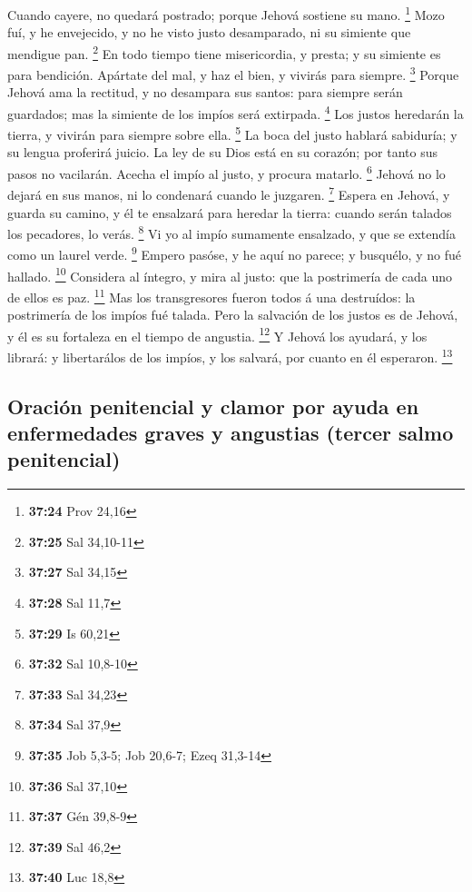  Cuando cayere, no quedará postrado; porque Jehová sostiene
su mano. \footnote{\textbf{37:24} Prov 24,16}  Mozo fuí, y
he envejecido, y no he visto justo desamparado, ni su simiente que
mendigue pan. \footnote{\textbf{37:25} Sal 34,10-11}  En
todo tiempo tiene misericordia, y presta; y su simiente es para
bendición.  Apártate del mal, y haz el bien, y vivirás para
siempre. \footnote{\textbf{37:27} Sal 34,15}  Porque Jehová
ama la rectitud, y no desampara sus santos: para siempre serán
guardados; mas la simiente de los impíos será extirpada. \footnote{\textbf{37:28}
  Sal 11,7}  Los justos heredarán la tierra, y vivirán para
siempre sobre ella. \footnote{\textbf{37:29} Is 60,21}  La
boca del justo hablará sabiduría; y su lengua proferirá juicio.
 La ley de su Dios está en su corazón; por tanto sus pasos
no vacilarán.  Acecha el impío al justo, y procura matarlo.
\footnote{\textbf{37:32} Sal 10,8-10}  Jehová no lo dejará
en sus manos, ni lo condenará cuando le juzgaren. \footnote{\textbf{37:33}
  Sal 34,23}  Espera en Jehová, y guarda su camino, y él te
ensalzará para heredar la tierra: cuando serán talados los pecadores, lo
verás. \footnote{\textbf{37:34} Sal 37,9}  Vi yo al impío
sumamente ensalzado, y que se extendía como un laurel verde. \footnote{\textbf{37:35}
  Job 5,3-5; Job 20,6-7; Ezeq 31,3-14}  Empero pasóse, y he
aquí no parece; y busquélo, y no fué hallado. \footnote{\textbf{37:36}
  Sal 37,10}  Considera al íntegro, y mira al justo: que la
postrimería de cada uno de ellos es paz. \footnote{\textbf{37:37} Gén
  39,8-9}  Mas los transgresores fueron todos á una
destruídos: la postrimería de los impíos fué talada.  Pero
la salvación de los justos es de Jehová, y él es su fortaleza en el
tiempo de angustia. \footnote{\textbf{37:39} Sal 46,2}  Y
Jehová los ayudará, y los librará: y libertarálos de los impíos, y los
salvará, por cuanto en él esperaron. \footnote{\textbf{37:40} Luc 18,8}

\hypertarget{oraciuxf3n-penitencial-y-clamor-por-ayuda-en-enfermedades-graves-y-angustias-tercer-salmo-penitencial}{%
\subsection{Oración penitencial y clamor por ayuda en enfermedades
graves y angustias (tercer salmo
penitencial)}\label{oraciuxf3n-penitencial-y-clamor-por-ayuda-en-enfermedades-graves-y-angustias-tercer-salmo-penitencial}}


